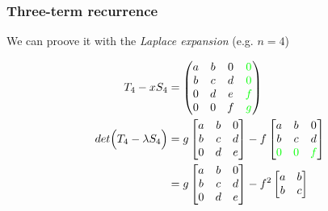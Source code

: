 \documentclass{beamer}
\theoremstyle{definition} \newtheorem{de}{Def}
\theoremstyle{remark} \newtheorem{os}[de]{Remark}
\theoremstyle{plain} \newtheorem{te}[de]{Teo}
\theoremstyle{plain} \newtheorem{co}[de]{Cor}
\theoremstyle{plain} \newtheorem{pr}[de]{Prop}
\theoremstyle{plain} \newtheorem{lem}[de]{Lemm}
\theoremstyle{remark} \newtheorem{rem}[de]{Remark}
\begin{document}
\begin{frame}
  \frametitle{Three-term recurrence}

  We can proove it with the \emph{Laplace expansion} (e.g. $n=4$)

  \begin{align*}
    T_4 - x S_4  &= \begin{pmatrix} 
      a & b & 0 & \textcolor{green}{0}\\
      b & c & d & \textcolor{green}{0}\\
      0 & d & e & \textcolor{green}{f}\\
      0 & 0 & f & \textcolor{green}{g}
    \end{pmatrix} \\
    det \Big( T_4 - \lambda S_4 \Big) &= g \begin{bmatrix}
      a & b & 0\\
      b & c & d\\
      0 & d & e
    \end{bmatrix} -f \begin{bmatrix}
      a & b & 0\\
      b & c & d\\
      \textcolor{green}{0} & \textcolor{green}{0} & \textcolor{green}{f}
    \end{bmatrix}\\
    &= g \begin{bmatrix} 
      a & b & 0\\
      b & c & d\\
      0 & d & e
    \end{bmatrix} - f^2 \begin{bmatrix} a & b \\ b & c \end{bmatrix}
  \end{align*}

\end{frame}
\end{document}
